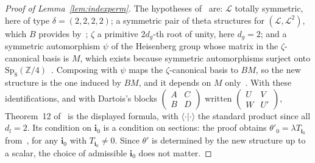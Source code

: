 \documentclass[version=preprint]{iacrcc}
\begin{document}
    \begin{proof}[Proof of Lemma~\ref{lem:indexperm}]
        The hypotheses of~\cite[Theorem 12]{Dar24} are: $\mathcal L$ totally
        symmetric, here of type $\delta = (2, 2, 2, 2)$; a symmetric pair of theta
        structures for $(\mathcal L, \mathcal L^2)$, which $B$ provides
        by~\cite[Theorem 5]{Dar24}; $\zeta$ a primitive $2 d_g$-th root of unity,
        here $d_g = 2$; and a symmetric automorphism $\psi$ of the Heisenberg
        group whose matrix in the $\zeta$-canonical basis is $M$, which exists
        because symmetric automorphisms surject onto
        $\mathrm{Sp}_8(\mathbb Z/4)$~\cite[Section 2.11]{Dar24}. Composing with
        $\psi$ maps the $\zeta$-canonical basis to $BM$, so the new structure is
        the one induced by $BM$, and it depends on $M$ only~\cite[Theorem
        5(ii)]{Dar24}. With these identifications, and with Dartois's blocks
        $\left(\begin{smallmatrix} A & C \\ B & D \end{smallmatrix}\right)$
        written $\left(\begin{smallmatrix} U & V \\ W & U' \end{smallmatrix}\right)$,
        Theorem~12 of~\cite{Dar24} is the displayed formula, with
        $\langle \cdot | \cdot \rangle$ the standard product since all $d_l = 2$.
        Its condition on $\mathbf i_0$ is a condition on sections: the proof
        obtains $\theta'_0 = \lambda T_{\mathbf i_0}$ from~\cite[Proposition
        8]{Dar24}, for any $\mathbf i_0$ with $T_{\mathbf i_0} \neq 0$. Since
        $\theta'$ is determined by the new structure up to a scalar, the choice
        of admissible $\mathbf i_0$ does not matter.


\end{proof}
\end{document}
